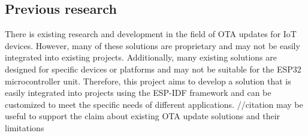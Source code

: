 \subsection{Previous research}
\label{sec:previous}
There is existing research and development in the field of OTA updates for IoT devices. However, many of these solutions are proprietary and may not be easily integrated into existing projects. Additionally, many existing solutions are designed for specific devices or platforms and may not be suitable for the ESP32 microcontroller unit. Therefore, this project aims to develop a solution that is easily integrated into projects using the ESP-IDF framework and can be customized to meet the specific needs of different applications. //citation may be useful to support the claim about existing OTA update solutions and their limitations